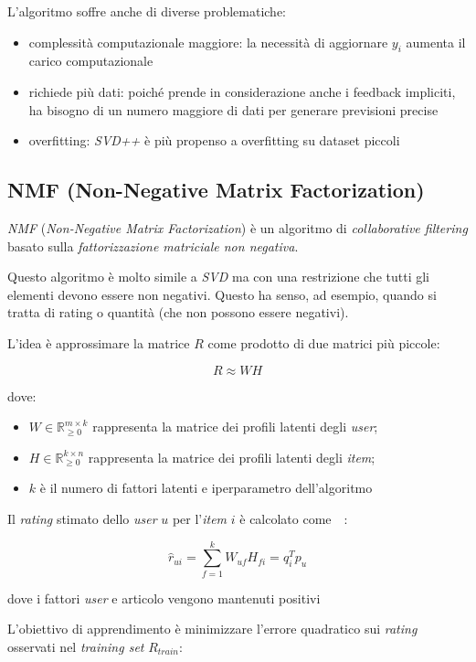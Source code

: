 L'algoritmo soffre anche di diverse problematiche:

\begin{itemize}
    \item complessità computazionale maggiore: la necessità di aggiornare $y_i$ aumenta il carico computazionale
    \item richiede più dati: poiché prende in considerazione anche i feedback impliciti, ha bisogno di un numero maggiore di dati per generare previsioni precise
    \item overfitting: \textit{SVD++} è più propenso a overfitting su dataset piccoli
\end{itemize}

\subsection{NMF (Non-Negative Matrix Factorization)}\label{nmf}

\textit{NMF} (\textit{Non-Negative Matrix Factorization}) è un algoritmo di \textit{collaborative filtering} basato sulla \textit{fattorizzazione matriciale non negativa}.  

Questo algoritmo è molto simile a \textit{SVD} ma con una restrizione che tutti gli elementi devono essere non negativi. Questo ha senso, ad esempio, quando si tratta di rating o quantità (che non possono essere negativi).

L'idea è approssimare la matrice $R$ come prodotto di due matrici più piccole:

\[
R \approx WH
\]

dove:
\begin{itemize}
    \item $W \in \mathbb{R}_{\geq 0}^{m \times k}$ rappresenta la matrice dei profili latenti degli \textit{user};
    \item $H \in \mathbb{R}_{\geq 0}^{k \times n}$ rappresenta la matrice dei profili latenti degli \textit{item};
    \item $k$ è il numero di fattori latenti e iperparametro dell'algoritmo
\end{itemize}

Il \textit{rating} stimato dello \textit{user} $u$ per l'\textit{item} $i$ è calcolato come~\cite{NMF2}~\cite{NMF3}:

\[
\hat{r}_{ui} = \sum_{f=1}^k W_{uf} H_{fi} = q_i^T p_u
\]

dove i fattori \textit{user} e articolo vengono mantenuti positivi

L'obiettivo di apprendimento è minimizzare l'errore quadratico sui \textit{rating} osservati nel \textit{training set} $R_{train}$:


